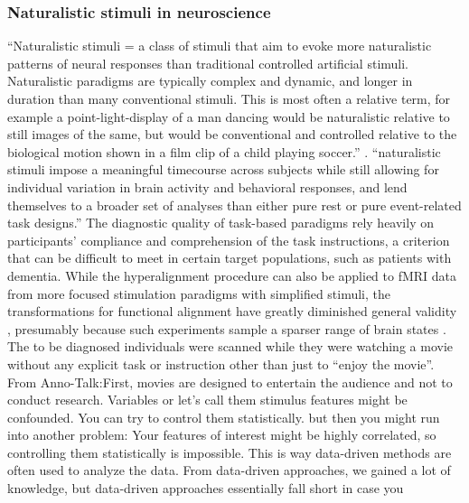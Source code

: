 \subsubsection{Naturalistic stimuli in neuroscience}


%
``Naturalistic stimuli = a class of stimuli that aim to evoke more naturalistic
patterns of neural responses than traditional controlled artificial stimuli.
Naturalistic paradigms are typically complex and dynamic, and longer in duration
than many conventional stimuli. This is most often a relative term, for example
a point-light-display of a man dancing would be naturalistic relative to still
images of the same, but would be conventional and controlled relative to the
biological motion shown in a film clip of a child playing soccer.''
\citep{vanderwal2019movies}.
%
``naturalistic stimuli impose a meaningful timecourse across subjects while
still allowing for individual variation in brain activity and behavioral
responses, and lend themselves to a broader set of analyses than either pure
rest or pure event-related task designs.'' \citep{finn2017can}
%
The diagnostic quality of task-based paradigms rely heavily on participants'
compliance and comprehension of the task instructions, a criterion that can be
difficult to meet in certain target populations, such as patients with dementia.
%
While the hyperalignment procedure can also be applied to fMRI data from more
focused stimulation paradigms with simplified stimuli, the transformations for
functional alignment have greatly diminished general validity
\citep{haxby2011common}, presumably because such experiments sample a sparser
range of brain states \citep{guntupalli2016model}.
%
The to be diagnosed individuals were scanned while they were watching a movie
without any explicit task or instruction other than just to ``enjoy the movie''.
%
From Anno-Talk:First, movies are designed to entertain the audience and not to
conduct research.  Variables or let’s call them stimulus features might be
confounded.  You can try to control them statistically. but then you might run
into another problem: Your features of interest might be highly correlated, so
controlling them statistically is impossible.  This is way data-driven methods
are often used to analyze the data.  From data-driven approaches, we gained a
lot of knowledge, but data-driven approaches essentially fall short in case you
